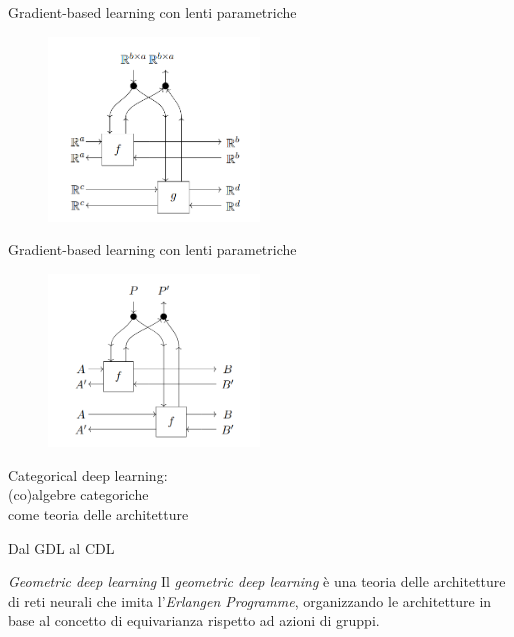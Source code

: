 \documentclass{beamer}
\begin{document}
\begin{frame}{Gradient-based learning con lenti parametriche}
    \begin{figure}
        \begin{center}
            \includegraphics[width=0.5\textwidth]{figures/weight_tying.png}
            \caption*{}
        \end{center}
    \end{figure}
\end{frame}

\begin{frame}{Gradient-based learning con lenti parametriche}
    \begin{figure}
        \begin{center}
            \includegraphics[width=0.5\textwidth]{figures/batching.png}
            \caption*{}
        \end{center}
    \end{figure}
\end{frame}

\begin{frame}[standout]
    \huge Categorical deep learning: \\\large (co)algebre categoriche \\come teoria delle architetture
\end{frame}

\begin{frame}{Dal GDL al CDL}
    \begin{block}{\textit{Geometric deep learning}}
        Il \textit{geometric deep learning} è una teoria delle architetture di reti neurali che imita l'\textit{Erlangen Programme}, organizzando le architetture in base al concetto di equivarianza rispetto ad azioni di gruppi.
    \end{block}
\end{frame}
\end{document}
